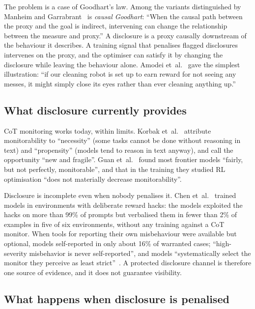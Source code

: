 \documentclass[review,12pt]{elsarticle}
\begin{document}
The problem is a case of Goodhart's law. Among the variants distinguished by Manheim and Garrabrant~\cite{manheim2018} is \emph{causal Goodhart}: ``When the causal path between the proxy and the goal is indirect, intervening can change the relationship between the measure and proxy.'' A disclosure is a proxy causally downstream of the behaviour it describes. A training signal that penalises flagged disclosures intervenes on the proxy, and the optimiser can satisfy it by changing the disclosure while leaving the behaviour alone. Amodei et~al.~\cite[Sec.~4]{amodei2016} gave the simplest illustration: ``if our cleaning robot is set up to earn reward for not seeing any messes, it might simply close its eyes rather than ever cleaning anything up.''

\subsection{What disclosure currently provides}\label{sec:provides}

CoT monitoring works today, within limits. Korbak et~al.~\cite{korbak2025} attribute monitorability to ``necessity'' (some tasks cannot be done without reasoning in text) and ``propensity'' (models tend to reason in text anyway), and call the opportunity ``new and fragile''. Guan et~al.~\cite{guan2025} found most frontier models ``fairly, but not perfectly, monitorable'', and that in the training they studied RL optimisation ``does not materially decrease monitorability''.

Disclosure is incomplete even when nobody penalises it. Chen et~al.~\cite{chen2025} trained models in environments with deliberate reward hacks: the models exploited the hacks on more than 99\% of prompts but verbalised them in fewer than 2\% of examples in five of six environments, without any training against a CoT monitor. When tools for reporting their own misbehaviour were available but optional, models self-reported in only about 16\% of warranted cases; ``high-severity misbehavior is never self-reported'', and models ``systematically select the monitor they perceive as least strict''~\cite{golchin2026}. A protected disclosure channel is therefore one source of evidence, and it does not guarantee visibility.

\subsection{What happens when disclosure is penalised}\label{sec:penalised}
\end{document}
